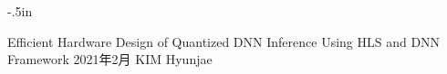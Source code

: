 
\thispagestyle{empty}
\topmargin -.5in

\begin{flushright}
  \begin{turn}{-90}
    Efficient Hardware Design of Quantized DNN Inference Using HLS and DNN Framework
    \qquad
    \qquad
    \quad
    \quad
    {\ja 2021年2月}
    \qquad
    \qquad
    \quad
    \quad
    KIM Hyunjae

  \end{turn}

\end{flushright}
